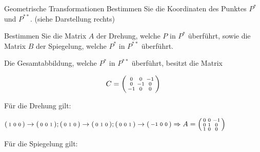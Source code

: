 \begin{example2}{Geometrische Transformationen}
    Bestimmen Sie die Koordinaten des Punktes $P^{*}$ und $P^{* *}$. (siehe Darstellung rechts)

    \vspace{3mm}

    Bestimmen Sie die Matrix $A$ der Drehung, welche $P$ in $P^{*}$ überführt, sowie die Matrix $B$ der Spiegelung, welche $P^{*}$ in $P^{* *}$ überführt.
    
    Die Gesamtabbildung, welche $P^{*}$ in $P^{* *}$ überführt, besitzt die Matrix

    $$
    C=\begin{psmallmatrix}
        0 & 0 & -1 \\
        0 & -1 & 0 \\
        -1 & 0 & 0
    \end{psmallmatrix}
    $$

    Für die Drehung gilt:

    $
    \begin{psmallmatrix}
        1 & 0 & 0
    \end{psmallmatrix} \rightarrow \begin{psmallmatrix}
        0 & 0 & 1
    \end{psmallmatrix} ; \begin{psmallmatrix}
        0 & 1 & 0
    \end{psmallmatrix} \rightarrow \begin{psmallmatrix}
        0 & 1 & 0
    \end{psmallmatrix} ; \begin{psmallmatrix}
        0 & 0 & 1
    \end{psmallmatrix} \rightarrow \begin{psmallmatrix}
        -1 & 0 & 0
    \end{psmallmatrix} \\ \Rightarrow A=\begin{psmallmatrix}
        0 & 0 & -1 \\
        0 & 1 & 0 \\
        1 & 0 & 0
    \end{psmallmatrix}
    $

    \vspace{2mm}

Für die Spiegelung gilt:


\end{example2}

